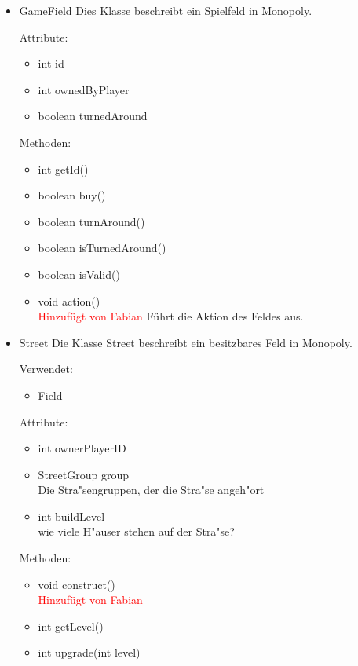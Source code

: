 \documentclass[a4paper,10pt]{article}
\begin{document}
\begin{itemize}
\item GameField
Dies Klasse beschreibt ein Spielfeld in Monopoly.

Attribute:
\begin{itemize}
\item int id
\item int ownedByPlayer
\item boolean turnedAround
\end{itemize}

Methoden:
\begin{itemize}
\item int getId()
\item boolean buy()
\item boolean turnAround()
\item boolean isTurnedAround()
\item boolean isValid()
\item void action()
\\ \textcolor{red}{Hinzufügt von Fabian} Führt die Aktion des Feldes aus.

\end{itemize}

\item Street
Die Klasse Street beschreibt ein besitzbares Feld in Monopoly.

Verwendet:
\begin{itemize}
\item Field
\end{itemize}

Attribute:
\begin{itemize}
\item int ownerPlayerID
\item StreetGroup group
\\Die Stra"sengruppen, der die Stra"se angeh"ort
\item int buildLevel
\\wie viele H"auser stehen auf der Stra"se?
\end{itemize}

Methoden:
\begin{itemize}
\item void construct()
\\ \textcolor{red}{Hinzufügt von Fabian}
\item int getLevel()
\item int upgrade(int level)
\end{itemize}



\end{itemize}
\end{document}
